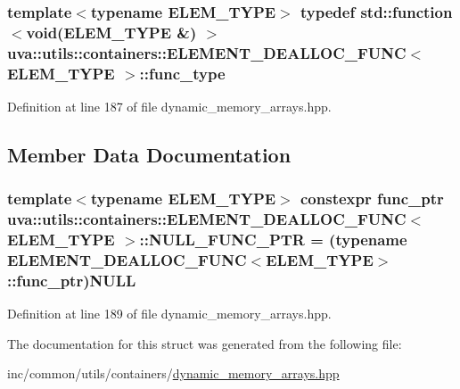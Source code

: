 \subsubsection[{func\+\_\+type}]{\setlength{\rightskip}{0pt plus 5cm}template$<$typename E\+L\+E\+M\+\_\+\+T\+Y\+P\+E$>$ typedef std\+::function$<$void(E\+L\+E\+M\+\_\+\+T\+Y\+P\+E \&) $>$ {\bf uva\+::utils\+::containers\+::\+E\+L\+E\+M\+E\+N\+T\+\_\+\+D\+E\+A\+L\+L\+O\+C\+\_\+\+F\+U\+N\+C}$<$ E\+L\+E\+M\+\_\+\+T\+Y\+P\+E $>$\+::{\bf func\+\_\+type}}\label{structuva_1_1utils_1_1containers_1_1_e_l_e_m_e_n_t___d_e_a_l_l_o_c___f_u_n_c_afb6d875c179834ef4e8deca9fff30090}


Definition at line 187 of file dynamic\+\_\+memory\+\_\+arrays.\+hpp.



\subsection{Member Data Documentation}
\hypertarget{structuva_1_1utils_1_1containers_1_1_e_l_e_m_e_n_t___d_e_a_l_l_o_c___f_u_n_c_aa48b076559717c3aedd65ddc46bd3702}{}
\subsubsection[{N\+U\+L\+L\+\_\+\+F\+U\+N\+C\+\_\+\+P\+T\+R}]{\setlength{\rightskip}{0pt plus 5cm}template$<$typename E\+L\+E\+M\+\_\+\+T\+Y\+P\+E$>$ constexpr {\bf func\+\_\+ptr} {\bf uva\+::utils\+::containers\+::\+E\+L\+E\+M\+E\+N\+T\+\_\+\+D\+E\+A\+L\+L\+O\+C\+\_\+\+F\+U\+N\+C}$<$ E\+L\+E\+M\+\_\+\+T\+Y\+P\+E $>$\+::N\+U\+L\+L\+\_\+\+F\+U\+N\+C\+\_\+\+P\+T\+R = (typename {\bf E\+L\+E\+M\+E\+N\+T\+\_\+\+D\+E\+A\+L\+L\+O\+C\+\_\+\+F\+U\+N\+C}$<$E\+L\+E\+M\+\_\+\+T\+Y\+P\+E$>$\+::{\bf func\+\_\+ptr})N\+U\+L\+L\hspace{0.3cm}{\ttfamily [static]}}\label{structuva_1_1utils_1_1containers_1_1_e_l_e_m_e_n_t___d_e_a_l_l_o_c___f_u_n_c_aa48b076559717c3aedd65ddc46bd3702}


Definition at line 189 of file dynamic\+\_\+memory\+\_\+arrays.\+hpp.



The documentation for this struct was generated from the following file\+:\begin{DoxyCompactItemize}
\item 
inc/common/utils/containers/\hyperlink{dynamic__memory__arrays_8hpp}{dynamic\+\_\+memory\+\_\+arrays.\+hpp}\end{DoxyCompactItemize}
